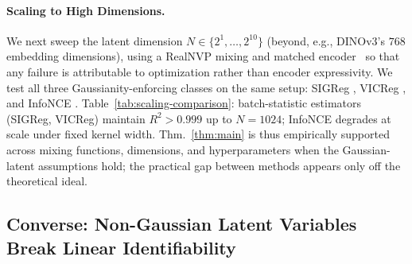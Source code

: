 \documentclass{article}
\begin{document}
\paragraph{Scaling to High Dimensions.}
We next sweep the latent dimension $N \in \{2^1,\ldots,2^{10}\}$ (beyond, e.g., DINOv3's $768$ embedding dimensions), using a RealNVP mixing and matched encoder~\citep{dinh2016density} so that any failure is attributable to optimization rather than encoder expressivity.
We test all three Gaussianity-enforcing classes on the same setup: SIGReg \citep{balestriero2025lejepa}, VICReg \citep{bardes2022}, and InfoNCE \citep{oord2018representation}. Table~\ref{tab:scaling-comparison}: batch-statistic estimators (SIGReg, VICReg) maintain $R^2 > 0.999$ up to $N = 1024$; InfoNCE degrades at scale under fixed kernel width.
Thm.~\ref{thm:main} is thus empirically supported across mixing functions, dimensions, and hyperparameters when the Gaussian-latent assumptions hold; the practical gap between methods appears only off the theoretical ideal.


\subsection{Converse: Non-Gaussian Latent Variables Break Linear Identifiability}
\label{sec:exp-nongauss}
\end{document}
